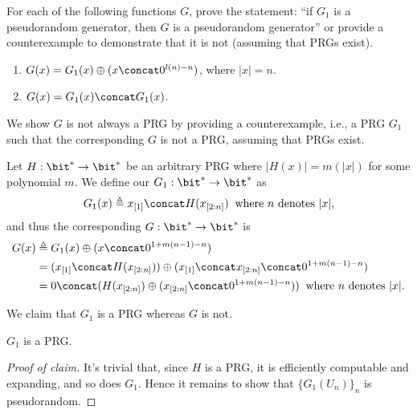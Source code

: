 \begin{problem}\label{p3}
For each of the following functions $G$, prove the statement: ``if $G_1$ is
a pseudorandom generator, then $G$ is a pseudorandom generator'' or provide a counterexample to demonstrate that it is not (assuming that PRGs exist).

\begin{enumerate}[label=(\roman*)]
    \item $G(x) = G_1(x) \oplus (x\concat 0^{l(n)-n})$, where $|x| = n$.
    \item $G(x) = G_1(x)\concat G_1(x)$.
\end{enumerate}
\end{problem}


\begin{answer}[i]
We show $G$ is not always a PRG by providing a counterexample, i.e., a PRG $G_1$ such that the corresponding $G$ is not a PRG, assuming that PRGs exist.

Let $H:\bit^\ast \to \bit^{\ast}$ be an arbitrary PRG where $|H(x)|=m(|x|)$ for some polynomial $m$. We define our ${G_1}:\bit^\ast\to \bit^{\ast}$ as
\[
    G_1 (x)\triangleq x_{[1]} \concat H(x_{[2:n]}) 
    \;\; \text{where } n \text{ denotes } |x|,
\]
and thus the corresponding $G:\bit^\ast\to \bit^{\ast}$ is
\begin{align}
    G(x)&\triangleq G_1(x)\oplus (x\concat 0^{1+m(n-1)-n}) \notag\\
    &= (x_{[1]} \concat H(x_{[2:n]}))\oplus (x_{[1]}\concat x_{[2:n]} \concat 0^{1+m(n-1)-n}) \notag\\
    &= 0 \concat (H(x_{[2:n]}) \oplus (x_{[2:n]} \concat 0^{1+m(n-1)-n}))
    \;\; \text{where } n \text{ denotes } |x|. \label{eq:p3-1-2}
\end{align}

We claim that $G_1$ is a PRG whereas $G$ is not.

\begin{claim}\label{claim:p3-1-1}
    $G_1$ is a PRG.
\end{claim}
\begin{proof}[Proof of claim]
    It's trivial that, since $H$ is a PRG, it is efficiently computable and expanding, and so does $G_1$. Hence it remains to show that $\{G_1(U_n)\}_n$ is pseudorandom.
    

\end{proof}
\end{answer}
